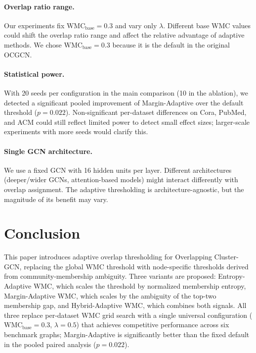\documentclass[a4paper,11pt,oneside,onecolumn,preprint]{elsarticle}
\numberwithin{equation}{section}
\begin{document}
\paragraph{Overlap ratio range.}
Our experiments fix $\mathrm{WMC}_{\mathrm{base}} = 0.3$ and vary only $\lambda$.
Different base WMC values could shift the overlap ratio range and affect the relative advantage of adaptive methods.
We chose $\mathrm{WMC}_{\mathrm{base}} = 0.3$ because it is the default in the original OCGCN.

\paragraph{Statistical power.}
With 20 seeds per configuration in the main comparison (10 in the ablation), we detected a significant pooled improvement of Margin-Adaptive over the default threshold ($p = 0.022$).
Non-significant per-dataset differences on Cora, PubMed, and ACM could still reflect limited power to detect small effect sizes; larger-scale experiments with more seeds would clarify this.

\paragraph{Single GCN architecture.}
We use a fixed GCN with 16 hidden units per layer.
Different architectures (deeper/wider GCNs, attention-based models) might interact differently with overlap assignment.
The adaptive thresholding is architecture-agnostic, but the magnitude of its benefit may vary.


\section{Conclusion}
\label{sec:conclusion}

This paper introduces adaptive overlap thresholding for Overlapping Cluster-GCN, replacing the global WMC threshold with node-specific thresholds derived from community-membership ambiguity.
Three variants are proposed: Entropy-Adaptive WMC, which scales the threshold by normalized membership entropy, Margin-Adaptive WMC, which scales by the ambiguity of the top-two membership gap, and Hybrid-Adaptive WMC, which combines both signals.
All three replace per-dataset WMC grid search with a single universal configuration ($\mathrm{WMC}_{\mathrm{base}} = 0.3$, $\lambda = 0.5$) that achieves competitive performance across six benchmark graphs; Margin-Adaptive is significantly better than the fixed default in the pooled paired analysis ($p=0.022$).
\end{document}
